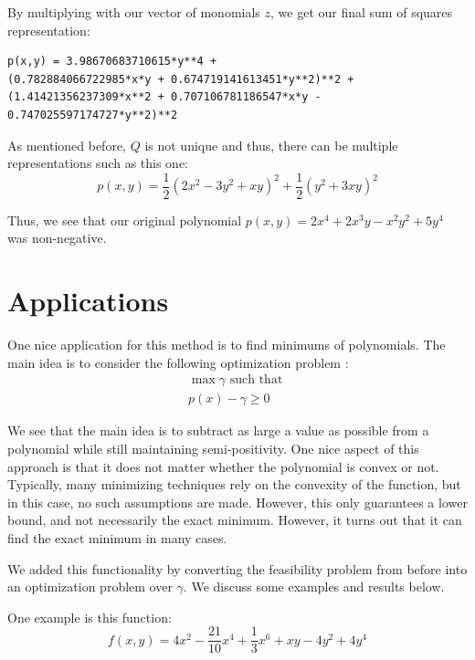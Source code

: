 \documentclass{article}
\begin{document}
By multiplying with our vector of monomials $z$, we get our final sum of squares representation:

\begin{verbatim}
p(x,y) = 3.98670683710615*y**4 + 
(0.782884066722985*x*y + 0.674719141613451*y**2)**2 + 
(1.41421356237309*x**2 + 0.707106781186547*x*y - 0.747025597174727*y**2)**2
\end{verbatim}

As mentioned before, $Q$ is not unique and thus, there can be multiple representations such as this one:
\[p(x,y) = \frac{1}{2}(2x^2-3y^2+xy)^2 + \frac{1}{2}(y^2+3xy)^2\]

Thus, we see that our original polynomial $p(x,y) = 2x^4 + 2x^3y - x^2y^2 + 5y^4$ was non-negative.

\section{Applications}

One nice application for this method is to find minimums of polynomials. The main idea is to consider the following optimization problem \cite{Parrilo03minimizingpolynomial}:
\begin{align*}
\max \gamma \text{ such that } \\
p(x)-\gamma \ge 0
\end{align*}

We see that the main idea is to subtract as large a value as possible from a polynomial while still maintaining semi-positivity. One nice aspect of this approach is that it does not matter whether the polynomial is convex or not. Typically, many minimizing techniques rely on the convexity of the function, but in this case, no such assumptions are made. However, this only guarantees a lower bound, and not necessarily the exact minimum. However, it turns out that it can find the exact minimum in many cases. 

We added this functionality by converting the feasibility problem from before into an optimization problem over $\gamma$. We discuss some examples and results below.

One example is this function:
\[f(x,y) = 4x^2 - \frac{21}{10}x^4 + \frac{1}{3}x^6 + xy - 4y^2 + 4y^4\]
\end{document}
